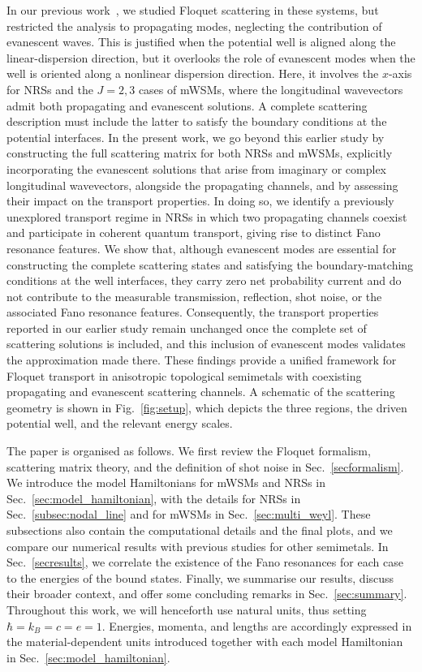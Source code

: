 \documentclass[aps,prb,onecolumn,longbibliography,nofootinbib,citeautoscript,10pt]{revtex4-2}
\begin{document}
In our previous work~\cite{bera2023}, we studied Floquet scattering in these systems, but restricted the analysis to propagating modes, neglecting the contribution of evanescent waves. This is justified when the potential well is aligned along the linear-dispersion direction, but it overlooks the role of evanescent modes when the well is oriented along a nonlinear dispersion direction. Here, it involves the $x$-axis for NRSs and the $J=2,3$ cases of mWSMs, where the longitudinal wavevectors admit both propagating and evanescent solutions. A complete scattering description must include the latter to satisfy the boundary conditions at the potential interfaces. In the present work, we go beyond this earlier study by constructing the full scattering matrix for both NRSs and mWSMs, explicitly incorporating the evanescent solutions that arise from imaginary or complex longitudinal wavevectors, alongside the propagating channels, and by assessing their impact on the transport properties. In doing so, we identify a previously unexplored transport regime in NRSs in which two propagating channels coexist and participate in coherent quantum transport, giving rise to distinct Fano resonance features. We show that, although evanescent modes are essential for constructing the complete scattering states and satisfying the boundary-matching conditions at the well interfaces, they carry zero net probability current and do not contribute to the measurable transmission, reflection, shot noise, or the associated Fano resonance features. Consequently, the transport properties reported in our earlier study remain unchanged once the complete set of scattering solutions is included, and this inclusion of evanescent modes validates the approximation made there. These findings provide a unified framework for Floquet transport in anisotropic topological semimetals with coexisting propagating and evanescent scattering channels. A schematic of the scattering geometry is shown in Fig.~\ref{fig:setup},  which depicts the three regions, the driven potential well, and the relevant energy scales.


The paper is organised as follows. We first review the Floquet formalism, scattering matrix theory, and the definition of shot noise in Sec.~\ref{secformalism}. We introduce the model Hamiltonians for mWSMs and NRSs in Sec.~\ref{sec:model_hamiltonian},  with the details for NRSs in Sec.~\ref{subsec:nodal_line} and for mWSMs in Sec.~\ref{sec:multi_weyl}. These subsections also contain the computational details and the final plots, and we compare our numerical results with previous studies for other semimetals. In Sec.~\ref{secresults}, we correlate the existence of the Fano resonances for each case to the energies of the bound states. Finally, we summarise our results, discuss their broader context, and offer some concluding remarks in Sec.~\ref{sec:summary}. Throughout this work, we will henceforth use natural units, thus setting $\hbar = k_B = c = e= 1$. Energies, momenta, and lengths are accordingly expressed in the material-dependent units introduced together with each model Hamiltonian in Sec.~\ref{sec:model_hamiltonian}.
\end{document}
